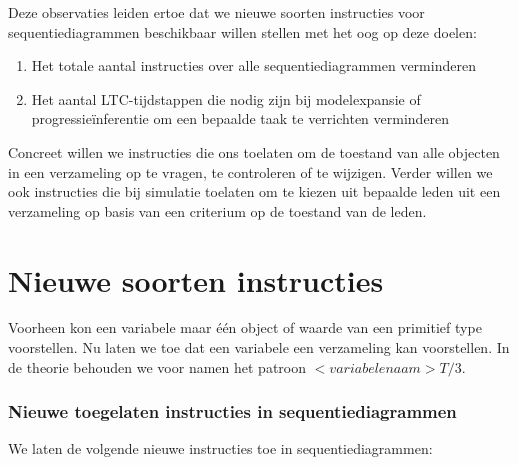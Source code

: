 Deze observaties leiden ertoe dat we nieuwe soorten instructies voor sequentiediagrammen beschikbaar willen stellen met het oog op deze doelen:

\begin{enumerate}
	\item Het totale aantal instructies over alle sequentiediagrammen verminderen
	\item Het aantal LTC-tijdstappen die nodig zijn bij modelexpansie of progressie\"inferentie om een bepaalde taak te verrichten verminderen
\end{enumerate}

Concreet willen we instructies die ons toelaten om de toestand van alle objecten in een verzameling op te vragen, te controleren of te wijzigen. Verder willen we ook instructies die bij simulatie toelaten om te kiezen uit bepaalde leden uit een verzameling op basis van een criterium op de toestand van de leden.

\section{Nieuwe soorten instructies}\label{sec:new-instr}

Voorheen kon een variabele maar \'e\'en object of waarde van een primitief type voorstellen. Nu laten we toe dat een variabele een verzameling kan voorstellen. In de theorie behouden we voor namen het patroon $<variabelenaam>T/3$.

\subsubsection{Nieuwe toegelaten instructies in sequentiediagrammen}

We laten de volgende nieuwe instructies toe in sequentiediagrammen:

